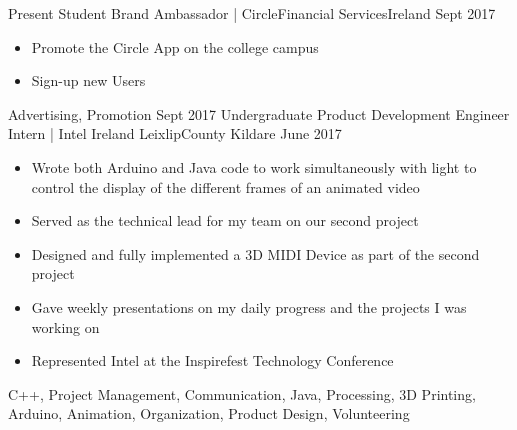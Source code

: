 
\begin{experiences}
  \experience
    {Present}   {Student Brand Ambassador | Circle}{Financial Services}{Ireland}
    {Sept 2017} {
                      \begin{itemize}
                        \item Promote the Circle App on the college campus    
                          \item Sign-up new Users                                                                             
                      \end{itemize}
                    }
                    {Advertising, Promotion}
  \emptySeparator
  \experience
    {Sept 2017} {Undergraduate Product Development Engineer Intern | Intel Ireland }{Leixlip}{County Kildare}
    {June 2017}    {
                      \begin{itemize}
                        \item Wrote both Arduino and Java code to work simultaneously with light to control the display of the different frames of an animated video                           
                        \item Served as the technical lead for my team on our second project            
                        \item Designed and fully implemented a 3D MIDI Device as part of the second project 
                        \item Gave weekly presentations on my daily progress and the projects I was working on
                        \item Represented Intel at the Inspirefest Technology Conference
                      \end{itemize}
                    }
                    {C++, Project Management, Communication, Java, Processing, 3D Printing, Arduino, Animation, Organization, Product Design, Volunteering}
   
\end{experiences}
